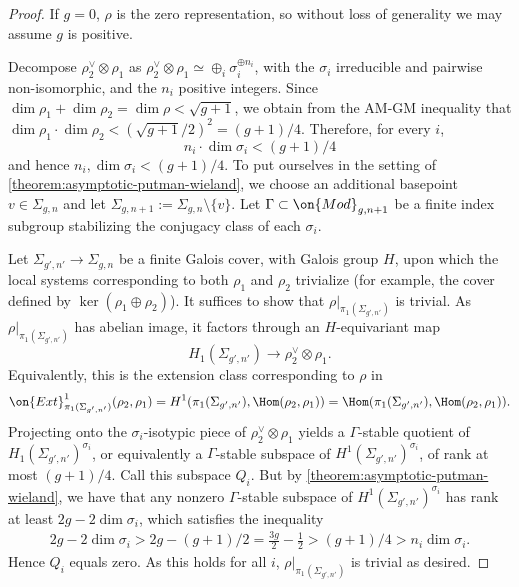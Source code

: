 \begin{proof}
If $g=0$, $\rho$ is the zero representation, so without loss of generality we may assume $g$ is positive.

	Decompose $\rho_2^\vee \otimes \rho_1$ as $\rho_2^\vee \otimes \rho_1 \simeq \oplus_i \sigma_i^{\oplus n_i}$, with the $\sigma_i$ irreducible and pairwise non-isomorphic, and the $n_i$ positive integers.
	Since $\dim \rho_1 + \dim \rho_2 = \dim \rho < \sqrt{g+1}$,
	we obtain from the AM-GM inequality that $\dim \rho_1 \cdot \dim \rho_2
	< (\sqrt{g+1}/2)^2 = (g+1)/4$. Therefore, for every $i$, $$n_i \cdot \dim
	\sigma_i < (g+1)/4$$
	and hence $n_i, \dim\sigma_i < (g+1)/4$.
	To put ourselves in the setting of
	\autoref{theorem:asymptotic-putman-wieland}, we choose an additional
	basepoint $v \in \Sigma_{g,n}$ and let $\Sigma_{g,n+1} := \Sigma_{g,n} \setminus\{v\}$. Let $\Gamma\subset \on{Mod}_{g, n+1}$ be a finite index subgroup stabilizing the conjugacy class of each $\sigma_i$.

	Let $\Sigma_{g',n'} \to \Sigma_{g,n}$ be a finite Galois cover, with Galois group $H$, upon which the local
	systems corresponding to both
	$\rho_1$ and $\rho_2$ trivialize (for example, the cover defined by $\ker(\rho_1\oplus\rho_2)$).
	It suffices to show that $\rho|_{\pi_1(\Sigma_{g',n'})}$ is trivial. As
	$\rho|_{\pi_1(\Sigma_{g',n'})}$ has abelian image, it factors through an
	$H$-equivariant map $$H_1(\Sigma_{g',n'})\to \rho_2^\vee\otimes
	\rho_1.$$ Equivalently, this is the extension class corresponding to
	$\rho$ in $$\on{Ext}^1_{\pi_1(\Sigma_{g', n'})}(\rho_2,
	\rho_1)=H^1(\pi_1(\Sigma_{g', n'}), \Hom(\rho_2,
	\rho_1))=\Hom(\pi_1(\Sigma_{g', n'}), \Hom(\rho_2, \rho_1)).$$
	Projecting onto the $\sigma_i$-isotypic piece of $\rho_2^\vee\otimes
	\rho_1$ yields a $\Gamma$-stable quotient of
	$H_1(\Sigma_{g',n'})^{\sigma_i}$, or equivalently a $\Gamma$-stable
	subspace of $H^1(\Sigma_{g',n'})^{\sigma_i}$, of rank at most $(g+1)/4$.
	Call this subspace $Q_i$.
	But by
	\autoref{theorem:asymptotic-putman-wieland}, we have that any nonzero
	$\Gamma$-stable subspace of $H^1(\Sigma_{g',n'})^{\sigma_i}$ has rank at
	least $2g-2\dim \sigma_i$, which satisfies the inequality
	\begin{align*}
		2g-2\dim \sigma_i >2g-(g+1)/2=\frac{3g}{2}-\frac{1}{2}>(g+1)/4
		> n_i \dim \sigma_i.
	\end{align*}
	Hence $Q_i$ equals zero. As this holds for all $i$, $\rho|_{\pi_1(\Sigma_{g',n'})}$ is trivial as desired.
\end{proof}

